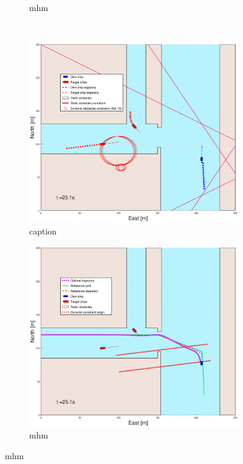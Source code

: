 \begin{figure}[!ht]
\begin{subfigure}[b]{0.499\textwidth}
        \caption{mhm}
    \end{subfigure}
    \hfill
    \\
    \begin{subfigure}[b]{0.49\textwidth}
        \centering
        \includegraphics[width=\textwidth]{Images/Figures/Havn1/_Simple_1fig1_time=25}
        \caption{caption}
    \end{subfigure}
    \hfill
    \begin{subfigure}[b]{0.499\textwidth}
        \centering
        \includegraphics[width=\textwidth]{Images/Figures/Havn1/_Simple_1fig999_time=25}
        \caption{mhm}
    \end{subfigure}
    \hfill
\end{figure}%
